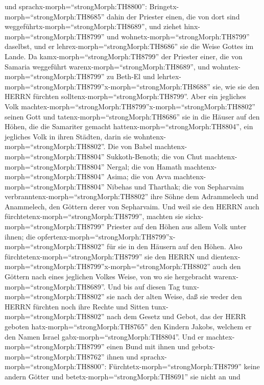 und sprachx-morph=``strongMorph:TH8800'':
Bringetx-morph=``strongMorph:TH8685'' dahin der Priester einen, die von
dort sind weggeführtx-morph=``strongMorph:TH8689'', und ziehet
hinx-morph=``strongMorph:TH8799'' und
wohnetx-morph=``strongMorph:TH8799'' daselbst, und er
lehrex-morph=``strongMorph:TH8686'' sie die Weise Gottes im Lande.
 Da kamx-morph=``strongMorph:TH8799'' der Priester einer,
die von Samaria weggeführt warenx-morph=``strongMorph:TH8689'', und
wohntex-morph=``strongMorph:TH8799'' zu Beth-El und
lehrtex-morph=``strongMorph:TH8799''x-morph=``strongMorph:TH8688'' sie,
wie sie den HERRN fürchten solltenx-morph=``strongMorph:TH8799''.
 Aber ein jegliches Volk
machtex-morph=``strongMorph:TH8799''x-morph=``strongMorph:TH8802''
seinen Gott und tatenx-morph=``strongMorph:TH8686'' sie in die Häuser
auf den Höhen, die die Samariter gemacht
hattenx-morph=``strongMorph:TH8804'', ein jegliches Volk in ihren
Städten, darin sie wohntenx-morph=``strongMorph:TH8802''. 
Die von Babel machtenx-morph=``strongMorph:TH8804'' Sukkoth-Benoth; die
von Chut machtenx-morph=``strongMorph:TH8804'' Nergal; die von Hamath
machtenx-morph=``strongMorph:TH8804'' Asima;  die von Avva
machtenx-morph=``strongMorph:TH8804'' Nibehas und Tharthak; die von
Sepharvaim verbranntenx-morph=``strongMorph:TH8802'' ihre Söhne dem
Adrammelech und Anammelech, den Göttern derer von Sepharvaim.
 Und weil sie den HERRN auch
fürchtetenx-morph=``strongMorph:TH8799'', machten sie
sichx-morph=``strongMorph:TH8799'' Priester auf den Höhen aus allem Volk
unter ihnen; die
opfertenx-morph=``strongMorph:TH8799''x-morph=``strongMorph:TH8802'' für
sie in den Häusern auf den Höhen.  Also
fürchtetenx-morph=``strongMorph:TH8799'' sie den HERRN und
dientenx-morph=``strongMorph:TH8799''x-morph=``strongMorph:TH8802'' auch
den Göttern nach eines jeglichen Volkes Weise, von wo sie hergebracht
warenx-morph=``strongMorph:TH8689''.  Und bis auf diesen
Tag tunx-morph=``strongMorph:TH8802'' sie nach der alten Weise, daß sie
weder den HERRN fürchten noch ihre Rechte und Sitten
tunx-morph=``strongMorph:TH8802'' nach dem Gesetz und Gebot, das der
HERR geboten hatx-morph=``strongMorph:TH8765'' den Kindern Jakobs,
welchem er den Namen Israel gabx-morph=``strongMorph:TH8804''.
 Und er machtex-morph=``strongMorph:TH8799'' einen Bund mit
ihnen und gebotx-morph=``strongMorph:TH8762'' ihnen und
sprachx-morph=``strongMorph:TH8800'':
Fürchtetx-morph=``strongMorph:TH8799'' keine andern Götter und
betetx-morph=``strongMorph:TH8691'' sie nicht an und
